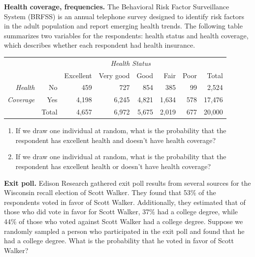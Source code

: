 \documentclass[12pt]{article}
\newcommand{\qt}[1]{\textcolor{custom_carnelian}{\textbf{#1.}}}
\begin{document}
\qt{Health coverage, frequencies\label{health_coverage_freqs}} The 
Behavioral Risk Factor Surveillance System (BRFSS) is an annual telephone survey 
designed to identify risk factors in the adult population and report emerging 
health trends. The following table summarizes two variables for the respondents: 
health status and health coverage, which describes whether each respondent had 
health insurance. 
\begin{center}
\begin{tabular}{rrrrrrrr}
                    &       & \multicolumn{5}{c}{\textit{Health Status}} &  \\ 
\cline{3-7}
                    &       & Excellent & Very good & Good  & Fair  & Poor  & Total\\ 
\cline{2-8}
\textit{Health}     & No    & 459       & 727       & 854   & 385   & 99    & 2,524 \\ 
\textit{Coverage}   & Yes   & 4,198     & 6,245     & 4,821 & 1,634 & 578   & 17,476 \\ 
\cline{2-8}
                    & Total & 4,657     & 6,972     & 5,675 & 2,019 & 677   & 20,000
\end{tabular}
\end{center}
\begin{enumerate}
\item If we draw one individual at random, what is the probability that the 
respondent has excellent health and doesn't have health coverage?

\vspace{1cm}
\item If we draw one individual at random, what is the probability that the 
respondent has excellent health or doesn't have health coverage?

\vspace{1cm}
\end{enumerate}
\clearpage



\qt{Exit poll\label{tree_exit_poll}} Edison Research gathered exit poll 
results from several sources for the Wisconsin recall election of Scott Walker. 
They found that 53\% of the respondents voted in favor of Scott Walker. 
Additionally, they estimated that of those who did vote in favor for Scott 
Walker, 37\% had a college degree, while 44\% of those who voted against Scott 
Walker had a college degree. Suppose we randomly sampled a person who 
participated in the exit poll and found that he had a college degree. What is the 
probability that he voted in favor of Scott Walker?
\vspace{1.5cm}
\end{document}
